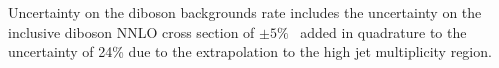 Uncertainty on the diboson backgrounds rate includes the uncertainty
on the inclusive diboson NNLO cross section of $\pm 5\%$~\cite{dibosonxs} added
in quadrature to the uncertainty of 24\% due to the extrapolation to the
high jet multiplicity region.






